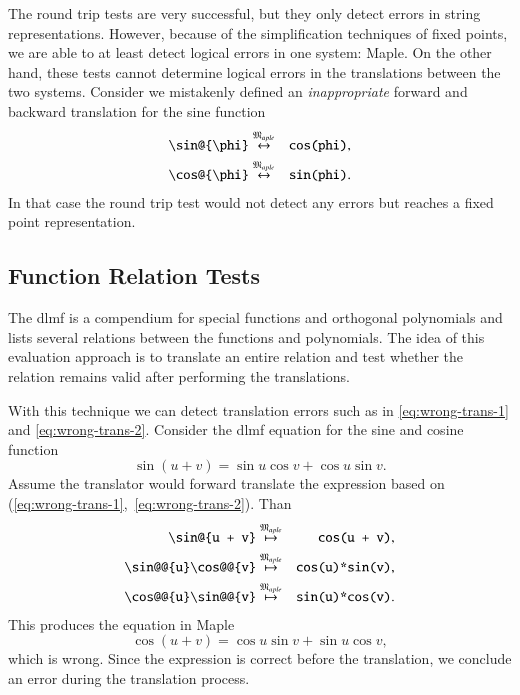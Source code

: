 \documentclass[a4paper,11pt]{article}
\newcommand{\Maple}{Maple}
\newcommand{\langMaple}{\mathfrak{M}_{aple}}
\theoremstyle{defTheoStyle}
\theoremstyle{defExampStyle}
\begin{document}
The round trip tests are very successful, but they only detect errors in string representations. However, because of the simplification techniques of fixed points, we are able to at least detect logical errors in one system: \Maple. On the other hand, these tests cannot determine logical errors in the translations between the two systems. Consider we mistakenly defined an \textit{inappropriate} forward and backward translation for the sine function
\begin{eqnarray}
\verb|\sin@{\phi}| & \overset{\langMaple}{\leftrightarrow} & \verb|cos(phi)|,\label{eq:wrong-trans-1}\\
\verb|\cos@{\phi}| & \overset{\langMaple}{\leftrightarrow} & \verb|sin(phi)|.\label{eq:wrong-trans-2}
\end{eqnarray}
In that case the round trip test would not detect any errors but reaches a fixed point representation.

\subsection{Function Relation Tests}\label{sec:relation-tests}
The \gls*{dlmf} is a compendium for special functions and orthogonal polynomials and lists several relations between the functions and polynomials. The idea of this evaluation approach is to translate an entire relation and test whether the relation remains valid after performing the translations.

With this technique we can detect translation errors such as in \eqref{eq:wrong-trans-1} and \eqref{eq:wrong-trans-2}. Consider the \gls*{dlmf} equation for the sine and cosine function~\parencite[(4.21.2)]{NIST:DLMF}
\begin{equation}
\sin \left(u+v\right) = \sin{u}\cos{v} + \cos{u}\sin{v}.
\end{equation}
Assume the translator would forward translate the expression based on (\ref{eq:wrong-trans-1},~\ref{eq:wrong-trans-2}). Than
\begin{eqnarray}
\verb|\sin@{u + v}| & \overset{\langMaple}{\mapsto} & \verb|cos(u + v)|,\\
\verb|\sin@@{u}\cos@@{v}| & \overset{\langMaple}{\mapsto} & \verb|cos(u)*sin(v)|,\\
\verb|\cos@@{u}\sin@@{v}| & \overset{\langMaple}{\mapsto} & \verb|sin(u)*cos(v)|.
\end{eqnarray}
This produces the equation in \Maple
\begin{equation}
\cos\left(u+v\right) = \cos{u}\sin{v} + \sin{u}\cos{v},
\end{equation}
which is wrong. Since the expression is correct before the translation, we conclude an error during the translation process.
\end{document}
